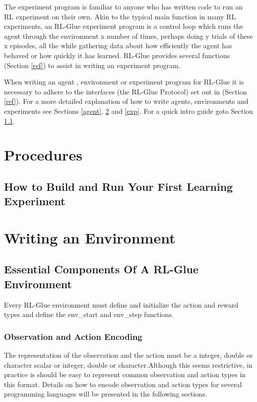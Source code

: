 \documentclass[11pt]{article}
\begin{document}
The experiment program is familiar to anyone who has written code to run an RL experiment on their own. Akin to the typical main function in many RL experiments, an RL-Glue experiment program is a control loop which runs the agent through the environment x number of times, perhaps doing y trials of these x episodes, all the while gathering data about how efficiently the agent has behaved or how quickly it has learned. RL-Glue provides several functions (Section \ref{ref}) to assist in writing an experiment program.


When writing an agent , environment or experiment program for RL-Glue it is necessary to adhere to the interfaces (the RL-Glue Protocol) set out in (Section \ref{ref}). For a more detailed explanation of how to write agents, environments and experiments see Sections \ref{agent}, \ref{env} and \ref{exp}. For a quick intro guide goto Section \ref{quick}.
\section{Procedures}
\subsection{How to Build and Run Your First Learning Experiment}
\label{quick}


\section{Writing an Environment}
\label{env}


\subsection{Essential Components Of A RL-Glue Environment}

Every RL-Glue environment must define and initialize the action and reward types and define the env\_start and env\_step functions.   

\subsubsection{Observation and Action Encoding}
The representation of the observation and the action must be a integer, double or character scalar or integer, double or character.Although this seems restrictive, in practice is should be easy to represent common observation and action types in this format. Details on how to encode observation and action types for several programming languages will be presented in the following sections.
\end{document}

